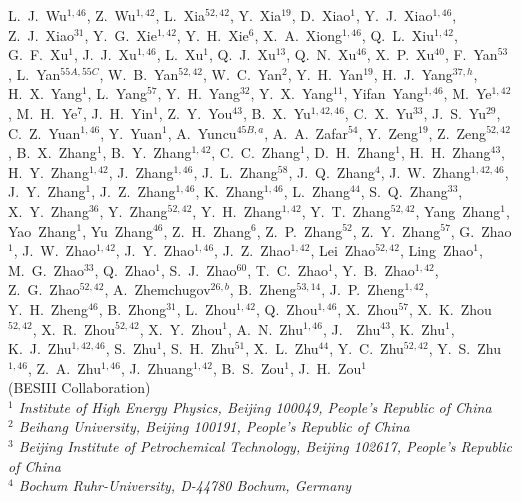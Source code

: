 {\begin{small}
L.~J.~Wu$^{1,46}$, Z.~Wu$^{1,42}$, L.~Xia$^{52,42}$, Y.~Xia$^{19}$, D.~Xiao$^{1}$, Y.~J.~Xiao$^{1,46}$, Z.~J.~Xiao$^{31}$, Y.~G.~Xie$^{1,42}$, Y.~H.~Xie$^{6}$, X.~A.~Xiong$^{1,46}$, Q.~L.~Xiu$^{1,42}$, G.~F.~Xu$^{1}$, J.~J.~Xu$^{1,46}$, L.~Xu$^{1}$, Q.~J.~Xu$^{13}$, Q.~N.~Xu$^{46}$, X.~P.~Xu$^{40}$, F.~Yan$^{53}$, L.~Yan$^{55A,55C}$, W.~B.~Yan$^{52,42}$, W.~C.~Yan$^{2}$, Y.~H.~Yan$^{19}$, H.~J.~Yang$^{37,h}$, H.~X.~Yang$^{1}$, L.~Yang$^{57}$, Y.~H.~Yang$^{32}$, Y.~X.~Yang$^{11}$, Yifan~Yang$^{1,46}$, M.~Ye$^{1,42}$, M.~H.~Ye$^{7}$, J.~H.~Yin$^{1}$, Z.~Y.~You$^{43}$, B.~X.~Yu$^{1,42,46}$, C.~X.~Yu$^{33}$, J.~S.~Yu$^{29}$, C.~Z.~Yuan$^{1,46}$, Y.~Yuan$^{1}$, A.~Yuncu$^{45B,a}$, A.~A.~Zafar$^{54}$, Y.~Zeng$^{19}$, Z.~Zeng$^{52,42}$, B.~X.~Zhang$^{1}$, B.~Y.~Zhang$^{1,42}$, C.~C.~Zhang$^{1}$, D.~H.~Zhang$^{1}$, H.~H.~Zhang$^{43}$, H.~Y.~Zhang$^{1,42}$, J.~Zhang$^{1,46}$, J.~L.~Zhang$^{58}$, J.~Q.~Zhang$^{4}$, J.~W.~Zhang$^{1,42,46}$, J.~Y.~Zhang$^{1}$, J.~Z.~Zhang$^{1,46}$, K.~Zhang$^{1,46}$, L.~Zhang$^{44}$, S.~Q.~Zhang$^{33}$, X.~Y.~Zhang$^{36}$, Y.~Zhang$^{52,42}$, Y.~H.~Zhang$^{1,42}$, Y.~T.~Zhang$^{52,42}$, Yang~Zhang$^{1}$, Yao~Zhang$^{1}$, Yu~Zhang$^{46}$, Z.~H.~Zhang$^{6}$, Z.~P.~Zhang$^{52}$, Z.~Y.~Zhang$^{57}$, G.~Zhao$^{1}$, J.~W.~Zhao$^{1,42}$, J.~Y.~Zhao$^{1,46}$, J.~Z.~Zhao$^{1,42}$, Lei~Zhao$^{52,42}$, Ling~Zhao$^{1}$, M.~G.~Zhao$^{33}$, Q.~Zhao$^{1}$, S.~J.~Zhao$^{60}$, T.~C.~Zhao$^{1}$, Y.~B.~Zhao$^{1,42}$, Z.~G.~Zhao$^{52,42}$, A.~Zhemchugov$^{26,b}$, B.~Zheng$^{53,14}$, J.~P.~Zheng$^{1,42}$, Y.~H.~Zheng$^{46}$, B.~Zhong$^{31}$, L.~Zhou$^{1,42}$, Q.~Zhou$^{1,46}$, X.~Zhou$^{57}$, X.~K.~Zhou$^{52,42}$, X.~R.~Zhou$^{52,42}$, X.~Y.~Zhou$^{1}$, A.~N.~Zhu$^{1,46}$, J.~~Zhu$^{43}$, K.~Zhu$^{1}$, K.~J.~Zhu$^{1,42,46}$, S.~Zhu$^{1}$, S.~H.~Zhu$^{51}$, X.~L.~Zhu$^{44}$, Y.~C.~Zhu$^{52,42}$, Y.~S.~Zhu$^{1,46}$, Z.~A.~Zhu$^{1,46}$, J.~Zhuang$^{1,42}$, B.~S.~Zou$^{1}$, J.~H.~Zou$^{1}$
\\
\vspace{0.2cm}
(BESIII Collaboration)\\
\vspace{0.2cm} {\it
$^{1}$ Institute of High Energy Physics, Beijing 100049, People's Republic of China\\
$^{2}$ Beihang University, Beijing 100191, People's Republic of China\\
$^{3}$ Beijing Institute of Petrochemical Technology, Beijing 102617, People's Republic of China\\
$^{4}$ Bochum Ruhr-University, D-44780 Bochum, Germany\\
}
\end{small}}
